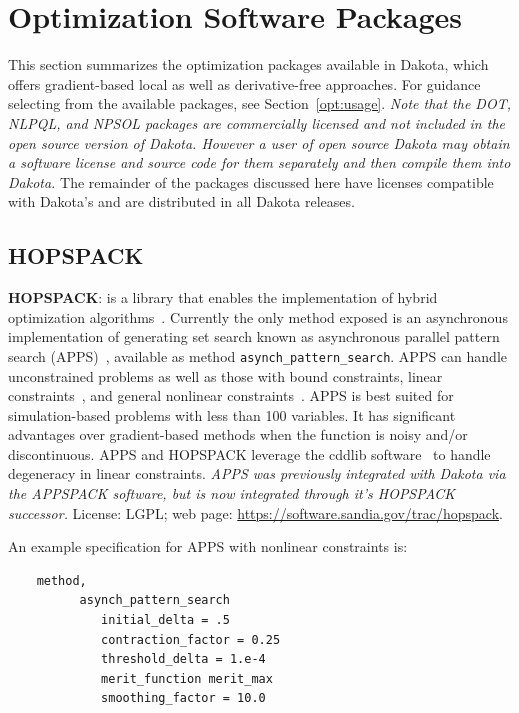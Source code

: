 \section{Optimization Software Packages}\label{opt:software}

This section summarizes the optimization packages available in Dakota,
which offers gradient-based local as well as derivative-free
approaches. For guidance selecting from the available packages, see
Section~\ref{opt:usage}. {\em Note that the DOT, NLPQL, and NPSOL
  packages are commercially licensed and not included in the open
  source version of Dakota. However a user of open source Dakota may
  obtain a software license and source code for them separately and
  then compile them into Dakota.}  The remainder of the packages
discussed here have licenses compatible with Dakota's and are
distributed in all Dakota releases.

\subsection{HOPSPACK}\label{opt:software:hopspack}

\textbf{HOPSPACK}: is a library that enables the implementation of
hybrid optimization algorithms~\cite{Plantenga2009}. Currently the
only method exposed is an asynchronous implementation of generating
set search known as asynchronous parallel pattern search
(APPS)~\cite{GrKo06}, available as method
\texttt{asynch\_pattern\_search}. APPS can handle unconstrained
problems as well as those with bound constraints, linear
constraints~\cite{GrKoLe08}, and general nonlinear
constraints~\cite{GrKo07}. APPS is best suited for simulation-based
problems with less than 100 variables. It has significant advantages
over gradient-based methods when the function is noisy and/or
discontinuous. APPS and HOPSPACK leverage the cddlib
software~\cite{Fu05} to handle degeneracy in linear constraints. {\em
  APPS was previously integrated with Dakota via the APPSPACK
  software, but is now integrated through it's HOPSPACK successor.}
License: LGPL; web page: \url{https://software.sandia.gov/trac/hopspack}.

An example specification for APPS with nonlinear constraints is:
\begin{small}
\begin{verbatim}
    method,
          asynch_pattern_search
             initial_delta = .5
             contraction_factor = 0.25
             threshold_delta = 1.e-4
             merit_function merit_max
             smoothing_factor = 10.0
\end{verbatim}
\end{small} %

